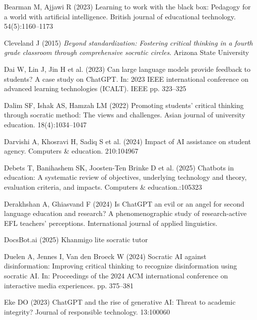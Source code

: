 \documentclass[
  11pt,
]{article}
\newlength{\cslhangindent}
\newenvironment{CSLReferences}[2] %
 {\begin{list}{}{%
  \setlength{\itemindent}{0pt}
  \setlength{\leftmargin}{0pt}
  \setlength{\parsep}{0pt}
  \ifodd #1
   \setlength{\leftmargin}{\cslhangindent}
   \setlength{\itemindent}{-1\cslhangindent}
  \fi
  \setlength{\itemsep}{#2\baselineskip}}}
 {\end{list}}
\begin{document}
\label{refs}
\begin{CSLReferences}{1}{0}
Bearman M, Ajjawi R (2023) Learning to work with the black box: Pedagogy for a world with artificial intelligence. British journal of educational technology. 54(5):1160--1173

Cleveland J (2015) \emph{Beyond standardization: Fostering critical thinking in a fourth grade classroom through comprehensive socratic circles}. Arizona State University

Dai W, Lin J, Jin H et al. (2023) Can large language models provide feedback to students? A case study on ChatGPT. In: 2023 IEEE international conference on advanced learning technologies (ICALT). IEEE pp. 323--325

Dalim SF, Ishak AS, Hamzah LM (2022) Promoting students' critical thinking through socratic method: The views and challenges. Asian journal of university education. 18(4):1034--1047

Darvishi A, Khosravi H, Sadiq S et al. (2024) Impact of AI assistance on student agency. Computers \& education. 210:104967

Debets T, Banihashem SK, Joosten-Ten Brinke D et al. (2025) Chatbots in education: A systematic review of objectives, underlying technology and theory, evaluation criteria, and impacts. Computers \& education.:105323

Derakhshan A, Ghiasvand F (2024) Is ChatGPT an evil or an angel for second language education and research? A phenomenographic study of research-active EFL teachers' perceptions. International journal of applied linguistics.

DocsBot.ai (2025) Khanmigo lite socratic tutor

Duelen A, Jennes I, Van den Broeck W (2024) Socratic AI against disinformation: Improving critical thinking to recognize disinformation using socratic AI. In: Proceedings of the 2024 ACM international conference on interactive media experiences. pp. 375--381

Eke DO (2023) ChatGPT and the rise of generative AI: Threat to academic integrity? Journal of responsible technology. 13:100060


\end{CSLReferences}
\end{document}
